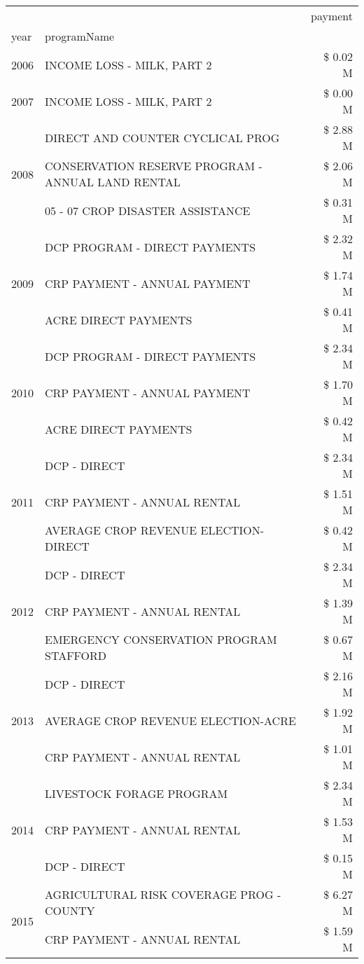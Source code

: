 \begin{tabular}{llr}
\toprule
 &  & payment \\
year & programName &  \\
\midrule
2006 & INCOME LOSS - MILK, PART 2 & \$ 0.02 M \\
\cline{1-3}
2007 & INCOME LOSS - MILK, PART 2 & \$ 0.00 M \\
\cline{1-3}
\multirow[t]{3}{*}{2008} & DIRECT AND COUNTER CYCLICAL PROG & \$ 2.88 M \\
 & CONSERVATION RESERVE PROGRAM - ANNUAL LAND RENTAL & \$ 2.06 M \\
 & 05 - 07 CROP DISASTER ASSISTANCE & \$ 0.31 M \\
\cline{1-3}
\multirow[t]{3}{*}{2009} & DCP PROGRAM - DIRECT PAYMENTS & \$ 2.32 M \\
 & CRP PAYMENT - ANNUAL PAYMENT & \$ 1.74 M \\
 & ACRE DIRECT PAYMENTS & \$ 0.41 M \\
\cline{1-3}
\multirow[t]{3}{*}{2010} & DCP PROGRAM - DIRECT PAYMENTS & \$ 2.34 M \\
 & CRP PAYMENT - ANNUAL PAYMENT & \$ 1.70 M \\
 & ACRE DIRECT PAYMENTS & \$ 0.42 M \\
\cline{1-3}
\multirow[t]{3}{*}{2011} & DCP - DIRECT & \$ 2.34 M \\
 & CRP PAYMENT - ANNUAL RENTAL & \$ 1.51 M \\
 & AVERAGE CROP REVENUE ELECTION-DIRECT & \$ 0.42 M \\
\cline{1-3}
\multirow[t]{3}{*}{2012} & DCP - DIRECT & \$ 2.34 M \\
 & CRP PAYMENT - ANNUAL RENTAL & \$ 1.39 M \\
 & EMERGENCY CONSERVATION PROGRAM STAFFORD & \$ 0.67 M \\
\cline{1-3}
\multirow[t]{3}{*}{2013} & DCP - DIRECT & \$ 2.16 M \\
 & AVERAGE CROP REVENUE ELECTION-ACRE & \$ 1.92 M \\
 & CRP PAYMENT - ANNUAL RENTAL & \$ 1.01 M \\
\cline{1-3}
\multirow[t]{3}{*}{2014} & LIVESTOCK FORAGE PROGRAM & \$ 2.34 M \\
 & CRP PAYMENT - ANNUAL RENTAL & \$ 1.53 M \\
 & DCP - DIRECT & \$ 0.15 M \\
\cline{1-3}
\multirow[t]{3}{*}{2015} & AGRICULTURAL RISK COVERAGE PROG - COUNTY & \$ 6.27 M \\
 & CRP PAYMENT - ANNUAL RENTAL & \$ 1.59 M \\

\end{tabular}
